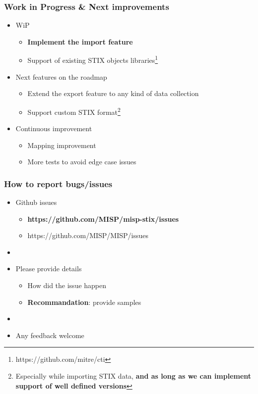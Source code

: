 \begin{frame}
    \frametitle{Work in Progress \& Next improvements}
    \begin{itemize}
        \item WiP
        \begin{itemize}
            \item {\bf Implement the import feature}
            \item Support of existing STIX objects libraries\footnote{https://github.com/mitre/cti}
        \end{itemize}
        \item Next features on the roadmap
        \begin{itemize}
            \item Extend the export feature to any kind of data collection
            \item Support custom STIX format\footnote{Especially while importing STIX data, {\bf and as long as we can implement support of well defined versions}}
        \end{itemize}
        \item Continuous improvement
        \begin{itemize}
            \item Mapping improvement
            \item More tests to avoid edge case issues
        \end{itemize}
    \end{itemize}
\end{frame}

\begin{frame}
    \frametitle{How to report bugs/issues}
    \begin{itemize}
        \item Github issues
        \begin{itemize}
            \item {\bf https://github.com/MISP/misp-stix/issues}
            \item https://github.com/MISP/MISP/issues
        \end{itemize}
        \item []
        \item Please provide details
        \begin{itemize}
            \item How did the issue happen
            \item {\bf Recommandation}: provide samples
        \end{itemize}
        \item[]
        \item Any feedback welcome
    \end{itemize}
\end{frame}

